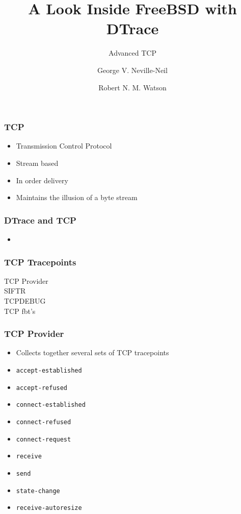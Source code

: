 \documentclass[pdftex]{beamer}
\begin{document}

\title{A Look Inside FreeBSD with DTrace}
\subtitle{Advanced TCP}
\author[shortname]{George V. Neville-Neil \and Robert N. M. Watson}

\begin{frame}
  \frametitle{TCP}
  \begin{itemize}
  \item Transmission Control Protocol
  \item Stream based
  \item In order delivery
  \item Maintains the illusion of a byte stream
  \end{itemize}
\end{frame}

\begin{frame}
  \frametitle{DTrace and TCP}
  \begin{itemize}
  \item 
  \end{itemize}
\end{frame}

\begin{frame}
  \frametitle{TCP Tracepoints}
  \begin{description}
  \item[TCP Provider] 
  \item[SIFTR]
  \item[TCPDEBUG]
  \item[TCP fbt's] 
\end{description}
\end{frame}

\begin{frame}[fragile]
  \frametitle{TCP Provider}
  \begin{itemize}
  \item Collects together several sets of TCP tracepoints
  \end{itemize}
  \begin{itemize}
  \item \verb|accept-established|
  \item \verb|accept-refused| 
  \item \verb|connect-established|  
  \item \verb|connect-refused|  
  \item \verb|connect-request|  
  \item \verb|receive|  
  \item \verb|send|  
  \item \verb|state-change|  
  \item \verb|receive-autoresize|  
  \end{itemize}
\end{frame}
\end{document}
